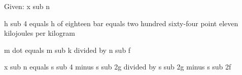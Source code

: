 Given: x sub n

h sub 4 equals h of eighteen bar equals two hundred sixty-four point eleven kilojoules per kilogram

m dot equals m sub k divided by n sub f

x sub n equals s sub 4 minus s sub 2g divided by s sub 2g minus s sub 2f